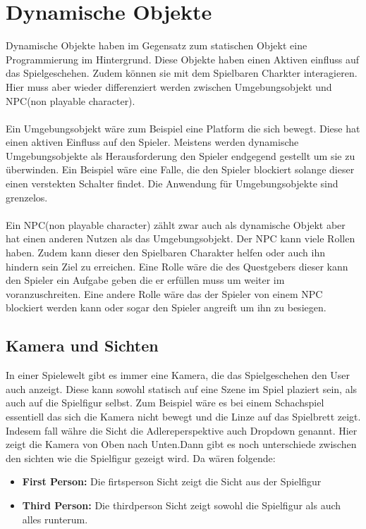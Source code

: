 \section{Dynamische Objekte}
Dynamische Objekte haben im Gegensatz zum statischen Objekt eine Programmierung im Hintergrund. Diese Objekte haben einen Aktiven einfluss auf das Spielgeschehen. Zudem können sie mit dem Spielbaren Charkter interagieren. Hier muss aber wieder differenziert werden zwischen Umgebungsobjekt und NPC(non playable character).\\\\
Ein Umgebungsobjekt wäre zum Beispiel eine Platform die sich bewegt. Diese hat einen aktiven Einfluss auf den Spieler. Meistens werden dynamische Umgebungsobjekte als Herausforderung den Spieler endgegend gestellt um sie zu überwinden. Ein Beispiel wäre eine Falle, die den Spieler blockiert solange dieser einen verstekten Schalter findet. Die Anwendung für Umgebungsobjekte sind grenzelos.\\\\
Ein NPC(non playable character) zählt zwar auch als dynamische Objekt aber hat einen anderen Nutzen als das Umgebungsobjekt. Der NPC kann viele Rollen haben. Zudem kann dieser den Spielbaren Charakter helfen oder auch ihn hindern sein Ziel zu erreichen. Eine Rolle wäre die des Questgebers dieser kann den Spieler ein Aufgabe geben die er erfüllen muss um weiter im voranzuschreiten. Eine andere Rolle wäre das der Spieler von einem NPC blockiert werden kann oder sogar den Spieler angreift um ihn zu besiegen.

\subsection{Kamera und Sichten}
In einer Spielewelt gibt es immer eine Kamera, die das Spielgeschehen den User auch anzeigt. Diese kann sowohl statisch auf eine Szene im Spiel plaziert sein, als auch auf die Spielfigur selbst. Zum Beispiel wäre es bei einem Schachspiel essentiell das sich die Kamera nicht bewegt und die Linze auf das Spielbrett zeigt. Indesem fall währe die Sicht die Adlereperspektive auch Dropdown genannt. Hier zeigt die Kamera von Oben nach Unten.Dann gibt es noch unterschiede zwischen den sichten wie die Spielfigur gezeigt wird. Da wären folgende:

\begin{itemize}
    \item \textbf{First Person:}
    \noindent Die firtsperson Sicht zeigt die Sicht aus der Spielfigur
    \item \textbf{Third Person:}
    \noindent Die thirdperson Sicht zeigt sowohl die Spielfigur als auch alles runterum. 
\end{itemize}

